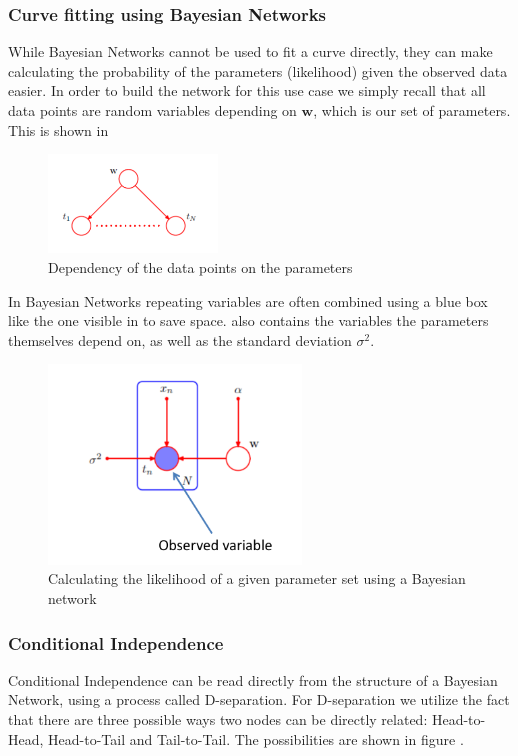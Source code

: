 \documentclass{article}
\begin{document}
\subsubsection{Curve fitting using Bayesian Networks}
While Bayesian Networks cannot be used to fit a curve directly, they can make calculating the probability of the parameters (likelihood) given the observed data easier.
In order to build the network for this use case we simply recall that all data points are random variables depending on $\mathbf{w}$, which is our set of parameters.
This is shown in 

\begin{figure}[h]
	\center
	\includegraphics[width=0.4\textwidth]{dependency.png}
	\caption{Dependency of the data points on the parameters}
	\label{im:dependency}
\end{figure}

In Bayesian Networks repeating variables are often combined using a blue box like the one visible in  to save space.
 also contains the variables the parameters themselves depend on, as well as the standard deviation $\sigma^2$.

\begin{figure}[h]
	\center
	\includegraphics[width=0.6\textwidth]{bnet-parameters.png}
	\caption{Calculating the likelihood of a given parameter set using a Bayesian network}
	\label{im:parameters}
\end{figure}

\subsubsection{Conditional Independence}
Conditional Independence can be read directly from the structure of a Bayesian Network, using a process called D-separation.
For D-separation we utilize the fact that there are three possible ways two nodes can be directly related: Head-to-Head, Head-to-Tail and Tail-to-Tail.
The possibilities are shown in figure .
\end{document}
